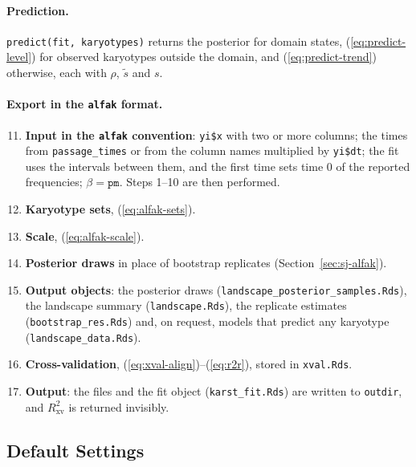\documentclass[11pt]{article}
\begin{document}
\paragraph{Prediction.}
\texttt{predict(fit, karyotypes)} returns the posterior for domain states,
(\ref{eq:predict-level}) for observed karyotypes outside the domain, and
(\ref{eq:predict-trend}) otherwise, each with $\rho$, $\tilde s$ and $s$.

\paragraph{Export in the \texttt{alfak} format.}
\begin{enumerate}
\setcounter{enumi}{10}
\item \textbf{Input in the \texttt{alfak} convention}: \texttt{yi\$x} with
two or more columns; the times from \texttt{passage\_times} or from the
column names multiplied by \texttt{yi\$dt}; the fit uses the intervals
between them, and the first time sets time 0 of the reported frequencies;
$\beta=\texttt{pm}$. Steps 1--10 are then performed.
\item \textbf{Karyotype sets}, (\ref{eq:alfak-sets}).
\item \textbf{Scale}, (\ref{eq:alfak-scale}).
\item \textbf{Posterior draws} in place of bootstrap replicates
(Section~\ref{sec:sj-alfak}).
\item \textbf{Output objects}: the posterior draws
(\texttt{landscape\_posterior\_samples.Rds}), the landscape summary
(\texttt{landscape.Rds}), the replicate estimates
(\texttt{bootstrap\_res.Rds}) and, on request, models that predict any
karyotype (\texttt{landscape\_data.Rds}).
\item \textbf{Cross-validation}, (\ref{eq:xval-align})--(\ref{eq:r2r}),
stored in \texttt{xval.Rds}.
\item \textbf{Output}: the files and the fit object (\texttt{karst\_fit.Rds})
are written to \texttt{outdir}, and $R^2_{\mathrm{xv}}$ is returned
invisibly.
\end{enumerate}

\subsection{Default Settings}
\end{document}
